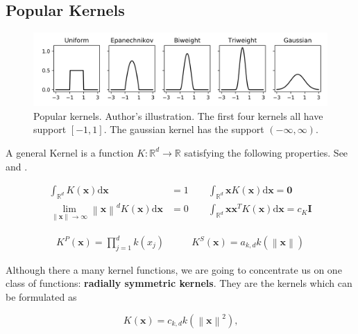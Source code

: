 \documentclass{article}
\newcommand{\norm}[1]{\left\lVert#1\right\rVert}
\begin{document}
\subsection{Popular Kernels}



\begin{figure}
	\centering
	\includegraphics[width=\textwidth]{figures/kde-popular-kernels}
	\caption[Popular kernels]{Popular kernels. Author's illustration. The first four kernels all have support $[-1, 1]$. The gaussian kernel has the support $(-\infty, \infty)$.}
	\label{fig:kde-popular-kernels}
\end{figure}

A general Kernel is a function $K : \mathbb{R}^d \rightarrow \mathbb{R}$ satisfying the following properties. See \citep{Comaniciu.2002} and \citep[p.~95]{Wand.1995}.

\begin{align*}
	\int_{\mathbb{R}^d} K(\bm{x})\mathrm{d}\bm{x} &= 1 \qquad \int_{\mathbb{R}^d} \bm{x} K(\bm{x})\mathrm{d}\bm{x} = \bm{0} \\
	\lim_{\norm{\bm{x}} \rightarrow \infty}  \norm{\bm{x}}^d K(\bm{x})\mathrm{d}\bm{x} &= 0 \qquad \int_{\mathbb{R}^d} \bm{x} \bm{x}^T K(\bm{x})\mathrm{d}\bm{x} = c_K \bm{I}
\end{align*}

\begin{align*}
	K^P(\bm{x}) = \prod_{j=1}^d k(x_j) & \qquad
	K^S(\bm{x}) = a_{k,d} k(\norm{\bm{x}})
\end{align*}

Although there a many kernel functions, we are going to concentrate us on one class of functions: \textbf{radially symmetric kernels}. They are the kernels which can be formulated as

\begin{equation}
	K(\bm{x}) = c_{k,d} k(\norm{\bm{x}}^2)\text{,}
\end{equation}
\end{document}

